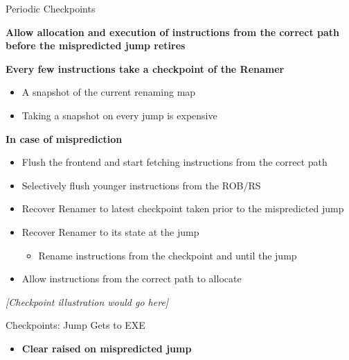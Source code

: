 \documentclass[aspectratio=169,12pt]{beamer}
\begin{document}
\begin{frame}{Periodic Checkpoints}
    \centering
    
    \textbf{Allow allocation and execution of instructions from the correct path before the mispredicted jump retires}
    
    \vspace{0.3cm}
    \textbf{Every few instructions take a checkpoint of the Renamer}
    \begin{itemize}
        \item A snapshot of the current renaming map
        \item Taking a snapshot on every jump is expensive
    \end{itemize}
    
    \textbf{In case of misprediction}
    \begin{itemize}
        \item Flush the frontend and start fetching instructions from the correct path
        \item Selectively flush younger instructions from the ROB/RS
        \item Recover Renamer to latest checkpoint taken prior to the mispredicted jump
        \item Recover Renamer to its state at the jump
        \begin{itemize}
            \item Rename instructions from the checkpoint and until the jump
        \end{itemize}
        \item Allow instructions from the correct path to allocate
    \end{itemize}
    
    \vspace{0.3cm}
    \textit{[Checkpoint illustration would go here]}
\end{frame}

\begin{frame}{Checkpoints: Jump Gets to EXE}
    \centering
    
    
    \vspace{1cm}
    \begin{itemize}
        \item \textbf{Clear raised on mispredicted jump}
    \end{itemize}
\end{frame}
\end{document}
